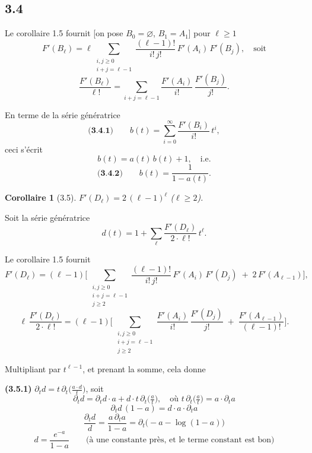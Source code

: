 \documentclass[11pt,a4paper]{article}
\theoremstyle{plain}
\newtheorem{corollary}[theorem]{Corollaire}
\theoremstyle{definition}
\begin{document}
\subsection*{3.4}

Le corollaire 1.5 fournit [on pose $B_0 = \varnothing$, $B_1 = A_1$] pour $\ell \geq 1$
\[
F'(B_\ell) = \ell \sum_{\substack{i,j \geq 0 \\ i+j=\ell-1}} \frac{(\ell-1)!}{i!\, j!}\, F'(A_i)\, F'(B_j), \quad \text{soit}
\]
\[
\frac{F'(B_\ell)}{\ell!} = \sum_{i+j=\ell-1} \frac{F'(A_i)}{i!}\, \frac{F'(B_j)}{j!}.
\]

En terme de la s\'erie g\'en\'eratrice
\[
\textbf{(3.4.1)} \qquad b(t) = \sum_{i=0}^{\infty} \frac{F'(B_i)}{i!}\, t^i,
\]
ceci s'\'ecrit
\[
b(t) = a(t)\, b(t) + 1, \quad \text{i.e.}
\]
\[
\textbf{(3.4.2)} \qquad b(t) = \frac{1}{1 - a(t)}.
\]

\newpage

\begin{corollary}[3.5]
$F'(D_\ell) = 2\, (\ell-1)^\ell$ \qquad ($\ell \geq 2$).
\end{corollary}

Soit la s\'erie g\'en\'eratrice
\[
d(t) = 1 + \sum_\ell \frac{F'(D_\ell)}{2 \cdot \ell!}\, t^\ell.
\]

Le corollaire 1.5 fournit
\[
F'(D_\ell) = (\ell-1) \Biggl[\, \sum_{\substack{i,j \geq 0 \\ i+j=\ell-1 \\ j \geq 2}} \frac{(\ell-1)!}{i!\, j!}\, F'(A_i)\, F'(D_j) \;+\; 2\, F'(A_{\ell-1}) \Biggr],
\]
\[
\ell \, \frac{F'(D_\ell)}{2 \cdot \ell!} = (\ell-1) \Biggl[\, \sum_{\substack{i,j \geq 0 \\ i+j=\ell-1 \\ j \geq 2}} \frac{F'(A_i)}{i!}\, \frac{F'(D_j)}{j!} \;+\; \frac{F'(A_{\ell-1})}{(\ell-1)!} \Biggr].
\]

Multipliant par $t^{\ell-1}$, et prenant la somme, cela donne

\smallskip

\noindent
\textbf{(3.5.1)} $\partial_t d = t\, \partial_t\bigl(\tfrac{a \cdot d}{t}\bigr)$, \quad soit
\[
\partial_t d = \partial_t d \cdot a + d \cdot t\, \partial_t\bigl(\tfrac{a}{t}\bigr), \quad \text{o\`u } t\, \partial_t\bigl(\tfrac{a}{t}\bigr) = a \cdot \partial_t a
\]
\[
\partial_t d\, (1-a) = d \cdot a \cdot \partial_t a
\]
\[
\frac{\partial_t d}{d} = \frac{a\, \partial_t a}{1-a} = \partial_t \bigl(-a - \log(1-a)\bigr)
\]
\[
d = \frac{e^{-a}}{1-a} \qquad \text{(\`a une constante pr\`es, et le terme constant est bon)}
\]
\end{document}

